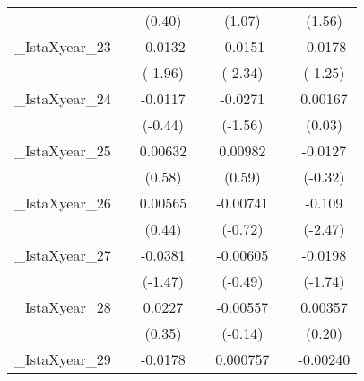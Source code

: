 {\begin{tabular}{l*{6}{c}}
            &                     &      (0.40)         &                     &      (1.07)         &                     &      (1.56)         \\
[1em]
\_IstaXyear\_23&                     &     -0.0132         &                     &     -0.0151\sym{*}  &                     &     -0.0178         \\
            &                     &     (-1.96)         &                     &     (-2.34)         &                     &     (-1.25)         \\
[1em]
\_IstaXyear\_24&                     &     -0.0117         &                     &     -0.0271         &                     &     0.00167         \\
            &                     &     (-0.44)         &                     &     (-1.56)         &                     &      (0.03)         \\
[1em]
\_IstaXyear\_25&                     &     0.00632         &                     &     0.00982         &                     &     -0.0127         \\
            &                     &      (0.58)         &                     &      (0.59)         &                     &     (-0.32)         \\
[1em]
\_IstaXyear\_26&                     &     0.00565         &                     &    -0.00741         &                     &      -0.109\sym{*}  \\
            &                     &      (0.44)         &                     &     (-0.72)         &                     &     (-2.47)         \\
[1em]
\_IstaXyear\_27&                     &     -0.0381         &                     &    -0.00605         &                     &     -0.0198         \\
            &                     &     (-1.47)         &                     &     (-0.49)         &                     &     (-1.74)         \\
[1em]
\_IstaXyear\_28&                     &      0.0227         &                     &    -0.00557         &                     &     0.00357         \\
            &                     &      (0.35)         &                     &     (-0.14)         &                     &      (0.20)         \\
[1em]
\_IstaXyear\_29&                     &     -0.0178         &                     &    0.000757         &                     &    -0.00240         \\

\end{tabular}}
